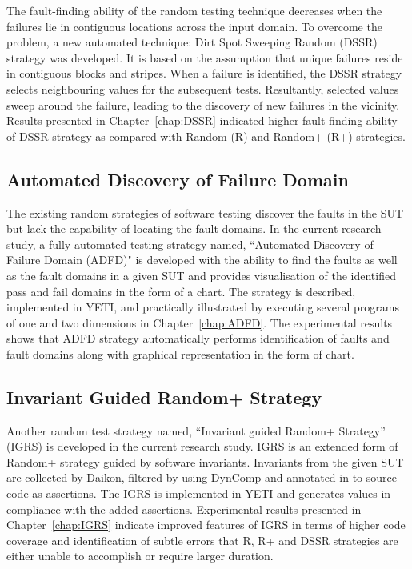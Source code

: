The fault-finding ability of the random testing technique decreases when the failures lie in contiguous locations across the input domain. To overcome the problem, a new automated technique: Dirt Spot Sweeping Random (DSSR) strategy was developed. It is based on the assumption that unique failures reside in contiguous blocks and stripes. When a failure is identified, the DSSR strategy selects neighbouring values for the subsequent tests. Resultantly, selected values sweep around the failure, leading to the discovery of new failures in the vicinity. Results presented in Chapter~\ref{chap:DSSR} indicated higher fault-finding ability of DSSR strategy as compared with Random (R) and Random+ (R+) strategies.

\subsection{Automated Discovery of Failure Domain}
The existing random strategies of software testing discover the faults in the SUT but lack the capability of locating the fault domains. In the current research study, a fully automated testing strategy named, ``Automated Discovery of Failure Domain (ADFD)" is developed with the ability to find the faults as well as the fault domains in a given SUT and provides visualisation of the identified pass and fail domains in the form of a chart. The strategy is described, implemented in YETI, and practically illustrated by executing several programs of one and two dimensions in Chapter~\ref{chap:ADFD}. The experimental results shows that ADFD strategy automatically performs identification of faults and fault domains along with graphical representation in the form of chart.

\subsection{Invariant Guided Random+ Strategy}
Another random test strategy named, ``Invariant guided Random+ Strategy'' (IGRS) is developed in the current research study. IGRS is an extended form of Random+ strategy guided by software invariants. Invariants from the given SUT are collected by Daikon, filtered by using DynComp and annotated in to source code as assertions. The IGRS is implemented in YETI and generates values in compliance with the added assertions. Experimental results presented in Chapter~\ref{chap:IGRS} indicate improved features of IGRS in terms of higher code coverage and identification of subtle errors that R, R+ and DSSR strategies are either unable to accomplish or require larger duration.  

